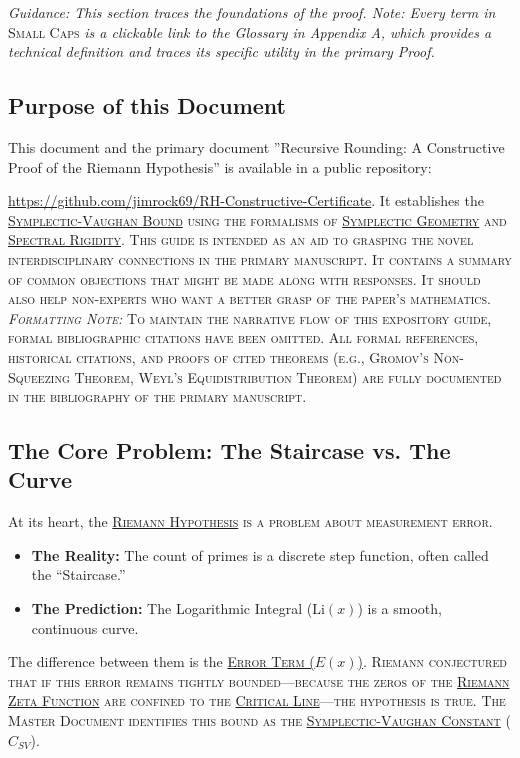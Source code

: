 \documentclass[sn-mathphys-num, pdflatex]{sn-jnl}
\newcommand{\gterm}[2]{\begingroup\normalfont\scshape\hyperlink{#1}{#2}\endgroup}
\begin{document}
\textit{Guidance: This section traces the foundations of the proof. Note: Every term in} \textsc{Small Caps} \textit{is a clickable link to the Glossary in Appendix A, which provides a technical definition and traces its specific utility in the primary Proof.}
\subsection{Purpose of this Document}
This document and the primary document ''Recursive Rounding: A Constructive Proof of the Riemann Hypothesis'' is available in a public repository:  

\noindent \url{https://github.com/jimrock69/RH-Constructive-Certificate}. It establishes the \gterm{sv_bound}{Symplectic-Vaughan Bound} using the formalisms of \gterm{geometry}{Symplectic Geometry} and \gterm{spectral}{Spectral Rigidity}. This guide is intended as an aid to grasping the novel interdisciplinary connections in the primary manuscript. It contains a summary of common objections that might be made along with responses. It should also help non-experts who want a better grasp of the paper's mathematics.  \textit{Formatting Note:} To maintain the narrative flow of this expository guide, formal bibliographic citations have been omitted. All formal references, historical citations, and proofs of cited theorems (e.g., Gromov's Non-Squeezing Theorem, Weyl's Equidistribution Theorem) are fully documented in the bibliography of the primary manuscript.

\subsection{The Core Problem: The Staircase vs. The Curve}
At its heart, the \gterm{rh}{Riemann Hypothesis} is a problem about measurement error.
\begin{itemize}
    \item \textbf{The Reality:} The count of primes is a discrete step function, often called the ``Staircase.''
    \item \textbf{The Prediction:} The Logarithmic Integral ($\text{Li}(x)$) is a smooth, continuous curve.
\end{itemize}
The difference between them is the \gterm{error_term}{Error Term ($E(x)$)}. Riemann conjectured that if this error remains tightly bounded---because the zeros of the \gterm{zeta}{Riemann Zeta Function} are confined to the \gterm{critical_line}{Critical Line}---the hypothesis is true.
The Master Document identifies this bound as the \gterm{csv}{Symplectic-Vaughan Constant} ($C_{SV}$).
\end{document}
